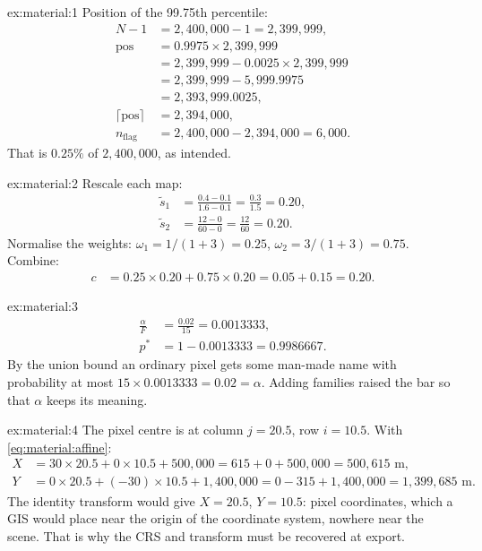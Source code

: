 
\begin{solution}{ex:material:1}
Position of the 99.75th percentile:
\begin{align*}
N-1 &= 2{,}400{,}000-1 = 2{,}399{,}999,\\
\text{pos} &= 0.9975\times2{,}399{,}999\\
&= 2{,}399{,}999-0.0025\times2{,}399{,}999\\
&= 2{,}399{,}999-5{,}999.9975\\
&= 2{,}393{,}999.0025,\\
\lceil\text{pos}\rceil &= 2{,}394{,}000,\\
n_{\text{flag}} &= 2{,}400{,}000-2{,}394{,}000 = 6{,}000.
\end{align*}
That is $0.25\%$ of $2{,}400{,}000$, as intended.
\end{solution}

\begin{solution}{ex:material:2}
Rescale each map:
\begin{align*}
\tilde{s}_1 &= \frac{0.4-0.1}{1.6-0.1} = \frac{0.3}{1.5} = 0.20,\\
\tilde{s}_2 &= \frac{12-0}{60-0} = \frac{12}{60} = 0.20.
\end{align*}
Normalise the weights: $\omega_1=1/(1+3)=0.25$, $\omega_2=3/(1+3)=0.75$. Combine:
\begin{align*}
c &= 0.25\times0.20+0.75\times0.20 = 0.05+0.15 = 0.20.
\end{align*}
\end{solution}

\begin{solution}{ex:material:3}
\begin{align*}
\frac{\alpha}{F} &= \frac{0.02}{15} = 0.0013333,\\
p^* &= 1-0.0013333 = 0.9986667.
\end{align*}
By the union bound an ordinary pixel gets some man-made name with probability at most
$15\times0.0013333=0.02=\alpha$. Adding families raised the bar so that $\alpha$ keeps its meaning.
\end{solution}

\begin{solution}{ex:material:4}
The pixel centre is at column $j=20.5$, row $i=10.5$. With \cref{eq:material:affine}:
\begin{align*}
X &= 30\times20.5+0\times10.5+500{,}000 = 615+0+500{,}000 = 500{,}615\text{ m},\\
Y &= 0\times20.5+(-30)\times10.5+1{,}400{,}000 = 0-315+1{,}400{,}000 = 1{,}399{,}685\text{ m}.
\end{align*}
The identity transform would give $X=20.5$, $Y=10.5$: pixel coordinates, which a GIS would place near the
origin of the coordinate system, nowhere near the scene. That is why the CRS and transform must be recovered
at export.
\end{solution}

